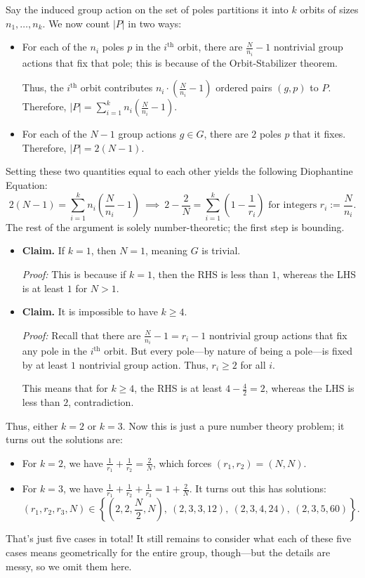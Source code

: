 Say the induced group action on the set of poles partitions it into $k$ orbits of sizes $n_1, \dots, n_k$.  We now count $|P|$ in two ways:
\begin{itemize}
    \item For each of the $n_i$ poles $p$ in the $i^{\text{th}}$ orbit, there are $\frac{N}{n_i} - 1$ nontrivial group actions that fix that pole; this is because of the Orbit-Stabilizer theorem.
    
    Thus, the $i^{\text{th}}$ orbit contributes $n_i \cdot \left(\frac{N}{n_i} - 1\right)$ ordered pairs $(g, p)$ to $P$.  Therefore, $|P| = \sum_{i = 1}^{k} n_i\left(\frac{N}{n_i} - 1\right)$.
    \item For each of the $N - 1$ group actions $g \in G$, there are $2$ poles $p$ that it fixes.  Therefore, $|P| = 2(N - 1)$.
\end{itemize}
Setting these two quantities equal to each other yields the following Diophantine Equation:
\[ 2(N - 1) = \sum_{i = 1}^k n_i\left(\dfrac{N}{n_i} - 1\right) ~ \implies ~ 2 - \dfrac{2}{N} = \sum_{i = 1}^k \left(1 - \dfrac{1}{r_i}\right) \text{ for integers } r_i := \dfrac{N}{n_i}. \]
The rest of the argument is solely number-theoretic; the first step is bounding.
\begin{itemize}
    \item \textbf{Claim.} If $k = 1$, then $N = 1$, meaning $G$ is trivial.

    \emph{Proof:} This is because if $k = 1$, then the RHS is less than $1$, whereas the LHS is at least $1$ for $N > 1$.
    \item \textbf{Claim.} It is impossible to have $k \geq 4$.

    \emph{Proof:} Recall that there are $\frac{N}{n_i} - 1 = r_i - 1$ nontrivial group actions that fix any pole in the $i^{\text{th}}$ orbit.  But every pole---by nature of being a pole---is fixed by at least $1$ nontrivial group action.  Thus, $r_i \geq 2$ for all $i$.

    This means that for $k \geq 4$, the RHS is at least $4 - \frac{4}{2} = 2$, whereas the LHS is less than $2$, contradiction.
\end{itemize}
Thus, either $k = 2$ or $k = 3$.  Now this is just a pure number theory problem; it turns out the solutions are:
\begin{itemize}
    \item For $k = 2$, we have $\frac{1}{r_1} + \frac{1}{r_2} = \frac{2}{N}$, which forces $(r_1, r_2) = (N, N)$.
    \item For $k = 3$, we have $\frac{1}{r_1} + \frac{1}{r_2} + \frac{1}{r_3} = 1 + \frac{2}{N}$.  It turns out this has solutions:
    \[ (r_1, r_2, r_3, N) \in \left \{ \left(2, 2, \frac{N}{2}, N\right), \ (2, 3, 3, 12), \ (2, 3, 4, 24), \ (2, 3, 5, 60) \right \}. \]
\end{itemize}
That's just five cases in total!  It still remains to consider what each of these five cases means geometrically for the entire group, though---but the details are messy, so we omit them here.

